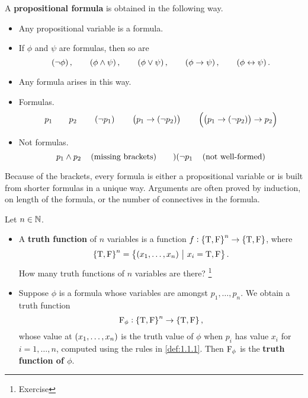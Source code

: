 \begin{definition}
\label{def:1.1.2}
A \textbf{propositional formula} is obtained in the following way.
\begin{itemize}
\item Any propositional variable is a formula.
\item If $ \phi $ and $ \psi $ are formulas, then so are
$$ \notb{\phi}, \qquad \andb{\phi}{\psi}, \qquad \orb{\phi}{\psi}, \qquad \impb{\phi}{\psi}, \qquad \iffb{\phi}{\psi}. $$
\item Any formula arises in this way.
\end{itemize}
\end{definition}

\pagebreak

\begin{example*}
\hfill
\begin{itemize}
\item Formulas.
$$ p_1 \qquad p_2 \qquad \notb{p_1} \qquad \impb{p_1}{\notb{p_2}} \qquad \impb{\impb{p_1}{\notb{p_2}}}{p_2} $$
\item Not formulas.
$$ p_1 \land p_2 \quad \br{\text{missing brackets}} \qquad )( \neg p_1 \quad \br{\text{not well-formed}} $$
\end{itemize}
\end{example*}

Because of the brackets, every formula is either a propositional variable or is built from shorter formulas in a unique way. Arguments are often proved by induction, on length of the formula, or the number of connectives in the formula.

\begin{definition}
Let $ n \in \mathbb{N} $.
\begin{itemize}
\item A \textbf{truth function} of $ n $ variables is a function $ f : \cbr{\T, \F}^n \to \cbr{\T, \F} $, where
$$ \cbr{\T, \F}^n = \cbr{\br{x_1, \dots, x_n} \st x_i = \T, \F}. $$
How many truth functions of $ n $ variables are there? \footnote{Exercise}
\item Suppose $ \phi $ is a formula whose variables are amongst $ p_1, \dots, p_n $. We obtain a truth function
$$ \F_\phi : \cbr{\T, \F}^n \to \cbr{\T, \F}, $$
whose value at $ \br{x_1, \dots, x_n} $ is the truth value of $ \phi $ when $ p_i $ has value $ x_i $ for $ i = 1, \dots, n $, computed using the rules in \ref{def:1.1.1}. Then $ \mathrm{F}_\phi $ is the \textbf{truth function of $ \phi $}.
\end{itemize}
\end{definition}

